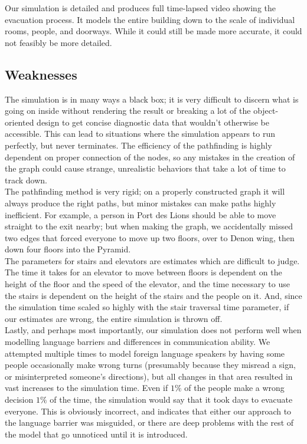 \documentclass[12pt]{article}
\begin{document}
Our simulation is detailed and produces full time-lapsed video showing the evacuation process. It models the entire building down to the scale of individual rooms, people, and doorways. While it could still be made more accurate, it could not feasibly be more detailed.

\subsection{Weaknesses}
The simulation is in many ways a black box; it is very difficult to discern what is going on inside without rendering the result or breaking a lot of the object-oriented design to get concise diagnostic data that wouldn't otherwise be accessible. This can lead to situations where the simulation appears to run perfectly, but never terminates. The efficiency of the pathfinding is highly dependent on proper connection of the nodes, so any mistakes in the creation of the graph could cause strange, unrealistic behaviors that take a lot of time to track down.\\

The pathfinding method is very rigid; on a properly constructed graph it will always produce the right paths, but minor mistakes can make paths highly inefficient. For example, a person in Port des Lions should be able to move straight to the exit nearby; but when making the graph, we accidentally missed two edges that forced everyone to move up two floors, over to Denon wing, then down four floors into the Pyramid.\\

The parameters for stairs and elevators are estimates which are difficult to judge. The time it takes for an elevator to move between floors is dependent on the height of the floor and the speed of the elevator, and the time necessary to use the stairs is dependent on the height of the stairs and the people on it. And, since the simulation time scaled so highly with the stair traversal time parameter, if our estimates are wrong, the entire simulation is thrown off.\\

Lastly, and perhaps most importantly, our simulation does not perform well when modelling language barriers and differences in communication ability. We attempted multiple times to model foreign language speakers by having some people occasionally make wrong turns (presumably because they misread a sign, or misinterpreted someone's directions), but all changes in that area resulted in vast increases to the simulation time. Even if $1\%$ of the people make a wrong decision $1\%$ of the time, the simulation would say that it took days to evacuate everyone. This is obviously incorrect, and indicates that either our approach to the language barrier was misguided, or there are deep problems with the rest of the model that go unnoticed until it is introduced.
\end{document}
